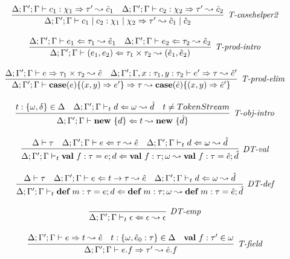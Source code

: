 \begin{figure}
\[\begin{array}{c}
\infer[\textit{T-casehelper2}]
	{\Delta; \Gamma'; \Gamma \vdash  c_1 \bnfalt c_2: \chi_1 \bnfalt \chi_2 \Rightarrow \tau' \leadsto \hat{c}_1 \bnfalt \hat{c}_2 } 
	{\Delta; \Gamma'; \Gamma \vdash c_1:\chi_1 \Rightarrow \tau' \leadsto \hat{c}_1 & \Delta; \Gamma'; \Gamma \vdash c_2:\chi_2 \Rightarrow \tau' \leadsto \hat{c}_2}
	\\[3ex]
\infer[\textit{T-prod-intro}]
	{\Delta; \Gamma'; \Gamma \vdash (e_1, e_2) \Leftarrow \tau_1 \times \tau_2 \leadsto (\hat{e}_1, \hat{e}_2)}
	{\Delta; \Gamma'; \Gamma \vdash e_1 \Leftarrow \tau_1 \leadsto \hat{e}_1 & 
	 \Delta; \Gamma'; \Gamma \vdash e_2 \Leftarrow \tau_2 \leadsto \hat{e}_2}
	 \\[3ex]
\infer[\textit{T-prod-elim}]
	{\Delta; \Gamma'; \Gamma \vdash \keyw{case}(e) \{ (x, y) \Rightarrow e' \} \Rightarrow \tau \leadsto \keyw{case}(\hat{e}) \{ (x, y) \Rightarrow \hat{e}' \}}
	{\Delta; \Gamma'; \Gamma \vdash e \Rightarrow \tau_1 \times \tau_2 \leadsto \hat{e} & 
	 \Delta; \Gamma'; \Gamma, x : \tau_1, y : \tau_2 \vdash e' \Rightarrow \tau \leadsto \hat{e}'}
	\\[3ex]
\infer[\textit{T-obj-intro}]
	{\Delta; \Gamma'; \Gamma \vdash \keyw{new}\ \{ d \} \Leftarrow  t \leadsto \keyw{new}\ \{\hat d\}}
	{ t:\{\omega, \delta\} \in \Delta & \Delta; \Gamma'; \Gamma \vdash_t d \Leftarrow \omega \leadsto \hat d & t\neq TokenStream} \\[3ex]

\infer[\textit{DT-val}]
	{\Delta; \Gamma'; \Gamma \vdash_t \keyw{val}~ f:\tau = e; d \Leftarrow \keyw{val}~ f:\tau; \omega \leadsto \keyw{val}~ f:\tau = \hat{e}; \hat{d}}
	{\Delta \vdash \tau &\Delta; \Gamma'; \Gamma \vdash e \Leftarrow \tau \leadsto \hat{e} & \Delta; \Gamma'; \Gamma \vdash_t d \Leftarrow \omega \leadsto \hat d} \\[3ex]
	
\infer[\textit{DT-def}]
	{\Delta; \Gamma'; \Gamma \vdash_t \keyw{def}~ m:\tau = e; d \Leftarrow \keyw{def}~ m:\tau; \omega \leadsto \keyw{def}~ m:\tau = \hat{e}; \hat{d} }
	{\Delta \vdash \tau  & \Delta; \Gamma'; \Gamma \vdash e  \Leftarrow t \rightarrow \tau \leadsto \hat{e} & \Delta; \Gamma'; \Gamma \vdash_t d \Leftarrow \omega \leadsto \hat d } \\[3ex]

\infer[\textit{DT-emp}]
	{\Delta; \Gamma'; \Gamma \vdash_t \epsilon \Leftarrow \epsilon \leadsto \epsilon}
	{ }\\[3ex]

\infer[\textit{T-field}]
	{\Delta; \Gamma'; \Gamma \vdash  e.f \Rightarrow \tau' \leadsto \hat{e}.f} 
	{\Delta; \Gamma'; \Gamma \vdash e \Rightarrow t \leadsto \hat{e} & t:\{\omega, \hat{e}_0:\tau\}\in \Delta & \keyw{val}\ f:\tau' \in \omega  }\\[3ex]


\end{array}\]
\end{figure}
